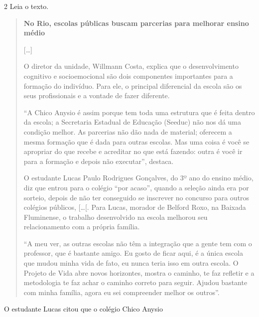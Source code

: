 \num{2} Leia o texto.

\begin{quote}
\textbf{No Rio, escolas públicas buscam parcerias para melhorar ensino médio}

{[}\ldots{}{]}

O diretor da unidade, Willmann Costa, explica que o desenvolvimento
cognitivo e socioemocional são dois componentes importantes para a
formação do indivíduo. Para ele, o principal diferencial da escola são
os seus profissionais e a vontade de fazer diferente.

``A Chico Anysio é assim porque tem toda uma estrutura que é feita
dentro da escola; a Secretaria Estadual de Educação (Seeduc) não nos dá
uma condição melhor. As parcerias não dão nada de material; oferecem a
mesma formação que é dada para outras escolas. Mas uma coisa é você se
apropriar do que recebe e acreditar no que está fazendo: outra é você ir
para a formação e depois não executar'', destaca.

O estudante Lucas Paulo Rodrigues Gonçalves, do 3º ano do ensino médio,
diz que entrou para o colégio ``por acaso'', quando a seleção ainda era
por sorteio, depois de não ter conseguido se inscrever no concurso para
outros colégios públicos, {[}\ldots{}{[}. Para Lucas, morador de Belford
Roxo, na Baixada Fluminense, o trabalho desenvolvido na escola melhorou
seu relacionamento com a própria família.

``A meu ver, as outras escolas não têm a integração que a gente tem com
o professor, que é bastante amigo. Eu gosto de ficar aqui, é a única
escola que mudou minha vida de fato, eu nunca teria isso em outra
escola. O Projeto de Vida abre novos horizontes, mostra o caminho, te
faz refletir e a metodologia te faz achar o caminho correto para seguir.
Ajudou bastante com minha família, agora eu sei compreender melhor os
outros''.

\end{quote}

O estudante Lucas citou que o colégio Chico Anysio

